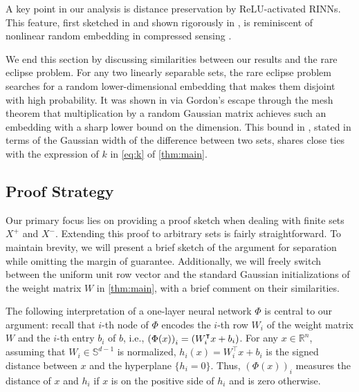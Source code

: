 \documentclass[aoap]{imsart}
\numberwithin{equation}{section}
\theoremstyle{definition}
\theoremstyle{remark}
\numberwithin{equation}{section}
\renewcommand{\S}{\mathbb{S}}
\newcommand{\0}{\mathbf{0}}
\newcommand{\1}{\mathbf{1}}
\renewcommand{\S}{\mathbb{S}}
\let \Re \relax
\DeclareMathOperator{\Re}{ReLU}
\numberwithin{equation}{section}
\begin{document}
A key point in our analysis is distance preservation by ReLU-activated RINNs. This feature, first sketched in \cite{an2015can} and shown rigorously in \cite{dirksen2021separation}, is reminiscent of nonlinear random embedding in compressed sensing \cite{jacques2013robust,plan2014dimension,oymak2015near,dirksen2021non}.

We end this section by discussing similarities between our results and the rare eclipse problem. For any two linearly separable sets, the rare eclipse problem searches for a random lower-dimensional embedding that makes them disjoint with high probability. It was shown in \cite{bandeira2017compressive} via Gordon's escape through the mesh theorem \cite{gordon1988milman} that multiplication by a random Gaussian matrix achieves such an embedding with a sharp lower bound on the dimension. This bound in \cite[Corollary~3.2]{bandeira2017compressive}, stated in terms of the Gaussian width of the difference between two sets, shares close ties with the expression of $k$ in \eqref{eq:k} of \cref{thm:main}.

 

  


\subsection{Proof Strategy}\label{sec:sketch}
Our primary focus lies on providing a proof sketch when dealing with finite sets $X^{+}$ and $X^{-}$. Extending this proof to arbitrary sets is fairly straightforward. To maintain brevity, we will present a brief sketch of the argument for separation while omitting the margin of guarantee. Additionally, we will freely switch between the uniform unit row vector and the standard Gaussian initializations of the weight matrix $W$ in \cref{thm:main}, with a brief comment on their similarities. 

The following interpretation of a one-layer neural network $\Phi$ is central to our argument: recall that $i$-th node of $\Phi$ encodes the $i$-th row $W_i$ of the weight matrix $W$ and the $i$-th entry $b_i$ of $b$, i.e., $\left(\Phi(x)\right)_{i} = \Re\left(W_{i}^{\intercal}x+b_{i}\right)$. For any $x\in \mathbb{R}^n$, assuming that $W_i\in\S^{d-1}$ is normalized, $h_i(x)=W^{\intercal}_ix+b_i$ is the signed distance between $x$ and the hyperplane $\lbrace h_i=0\rbrace$. Thus, $(\Phi(x))_{i}$ measures the distance of $x$ and $h_i$ if $x$ is on the positive side of $h_i$ and is zero otherwise.
\end{document}
